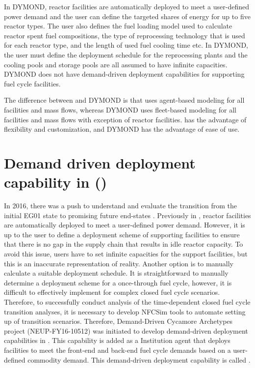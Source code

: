 In DYMOND, reactor facilities are automatically deployed to 
meet a user-defined power demand and the user can define 
the targeted shares of energy for up to five reactor types. 
The user also defines the fuel loading model used to calculate 
reactor spent fuel compositions, the type of reprocessing 
technology that is used for each reactor type, and the length 
of used fuel cooling time etc. 
In DYMOND, the user must define the deployment schedule for 
the reprocessing plants and the cooling pools and storage pools 
are all assumed to have infinite capacities. 
DYMOND does not have demand-driven deployment capabilities for 
supporting fuel cycle facilities. 

The difference between \Cyclus and DYMOND is that \Cyclus uses 
agent-based modeling for all facilities and mass flows, 
whereas DYMOND uses fleet-based modeling for all facilities and 
mass flows with exception of reactor facilities. 
\Cyclus has the advantage of flexibility and customization, 
and DYMOND has the advantage of ease of use. 

\section{Demand driven deployment capability in \Cyclus (\deploy)}
In 2016, there was a push to understand and evaluate the 
transition from the initial EG01 state to promising future 
end-states \cite{feng_standardized_2016}.
Previously in \Cyclus, reactor facilities are automatically 
deployed to meet a user-defined power demand. 
However, it is up to the user to define a deployment scheme of 
supporting facilities to ensure that there is no gap in the supply 
chain that results in idle reactor capacity. 
To avoid this issue, users 
have to set infinite capacities for the support facilities, 
but this is an inaccurate representation of reality. 
Another option is to manually calculate a suitable deployment 
schedule. 
It is straightforward to manually determine a deployment scheme 
for a once-through fuel cycle, however, it is difficult to effectively 
implement for complex closed fuel cycle scenarios.  
Therefore, to successfully conduct analysis of the time-dependent 
closed fuel cycle transition
analyses, it is necessary to develop \gls{NFCSim} tools to  
automate setting up of transition scenarios. 
Therefore, Demand-Driven Cycamore Archetypes project
(NEUP-FY16-10512) was initiated to develop demand-driven deployment 
capabilities in \Cyclus.
This capability is added as a \Cyclus Institution
agent that deploys facilities to meet the front-end and back-end 
fuel cycle demands based on a user-defined commodity demand. 
This demand-driven deployment capability is called 
\deploy. 


